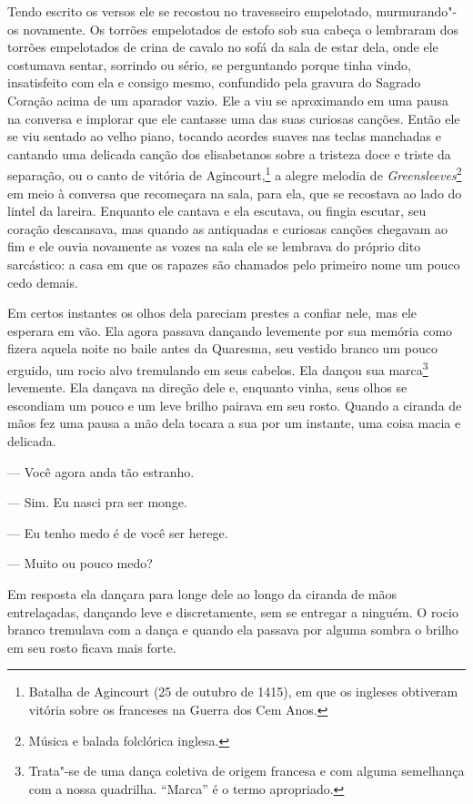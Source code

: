 Tendo escrito os versos ele se recostou no travesseiro empelotado,
murmurando"-os novamente. Os torrões empelotados de estofo sob sua
cabeça o lembraram dos torrões empelotados de crina de cavalo no sofá
da sala de estar dela, onde ele costumava sentar, sorrindo ou sério, se
perguntando porque tinha vindo, insatisfeito com ela e consigo mesmo,
confundido pela gravura do Sagrado Coração acima de um aparador vazio.
Ele a viu se aproximando em uma pausa na conversa e implorar que ele
cantasse uma das suas curiosas canções. Então ele se viu sentado ao
velho piano, tocando acordes suaves nas teclas manchadas e cantando uma
delicada canção dos elisabetanos sobre a tristeza doce e triste da
separação, ou o canto de vitória de Agincourt,\footnote{ Batalha de Agincourt
(25 de outubro de 1415), em que os ingleses obtiveram vitória sobre os franceses
na Guerra dos Cem Anos.} a alegre melodia de \textit{Greensleeves}\footnote{ Música e balada folclórica inglesa.} em meio à
conversa que recomeçara na sala, para ela, que se recostava ao lado do lintel da
lareira. Enquanto ele cantava e ela escutava, ou fingia escutar, seu coração
descansava, mas quando as antiquadas e curiosas canções chegavam ao fim e ele
ouvia novamente as vozes na sala ele se lembrava do próprio dito sarcástico: a
casa em que os rapazes são chamados pelo primeiro nome um pouco cedo
demais.

Em certos instantes os olhos dela pareciam prestes a confiar nele, mas
ele esperara em vão. Ela agora passava dançando levemente por sua
memória como fizera aquela noite no baile antes da Quaresma, seu
vestido branco um pouco erguido, um rocio alvo tremulando em seus
cabelos. Ela dançou sua marca\footnote{ Trata{}"-se de uma dança coletiva de 
origem francesa e com alguma semelhança com a nossa quadrilha. “Marca” é o termo apropriado.}
levemente. Ela dançava na direção dele e, enquanto vinha, seus olhos se
escondiam um pouco e um leve brilho pairava em seu rosto. Quando a
ciranda de mãos fez uma pausa a mão dela tocara a sua por um instante,
uma coisa macia e delicada.

 --- Você agora anda tão estranho.

 --- Sim. Eu nasci pra ser monge.

 --- Eu tenho medo é de você ser herege.

 --- Muito ou pouco medo?

Em resposta ela dançara para longe dele ao longo da ciranda de mãos
entrelaçadas, dançando leve e discretamente, sem se entregar a ninguém.
O rocio branco tremulava com a dança e quando ela passava por alguma
sombra o brilho em seu rosto ficava mais forte.

